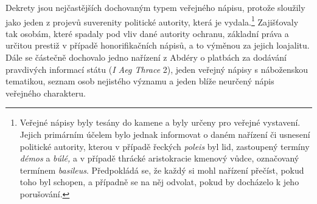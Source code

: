 Dekrety jsou nejčastějších dochovaným typem veřejného nápisu, protože sloužily jako jeden z projevů suverenity politické autority, která je vydala.\footnote{Veřejné nápisy byly tesány do kamene a byly určeny pro veřejné vystavení. Jejich primárním účelem bylo jednak informovat o daném nařízení či usnesení politické autority, kterou v případě řeckých {\em poleis} byl lid, zastoupený termíny {\em démos} a {\em búlé,} a v případě thrácké aristokracie kmenový vůdce, označovaný termínem {\em basileus}. Předpokládá se, že každý si mohl nařízení přečíst, pokud toho byl schopen, a případně se na něj odvolat, pokud by docházelo k jeho porušování.} Zajišťovaly tak osobám, které spadaly pod vliv dané autority ochranu, základní práva a určitou prestiž v případě honorifikačních nápisů, a to výměnou za jejich loajalitu. Dále se částečně dochovalo jedno nařízení z Abdéry o platbách za dodávání pravdivých informací státu ({\em I Aeg Thrace} 2), jeden veřejný nápisy s náboženskou tematikou, seznam osob nejistého významu a jeden blíže neurčený nápis veřejného charakteru.

